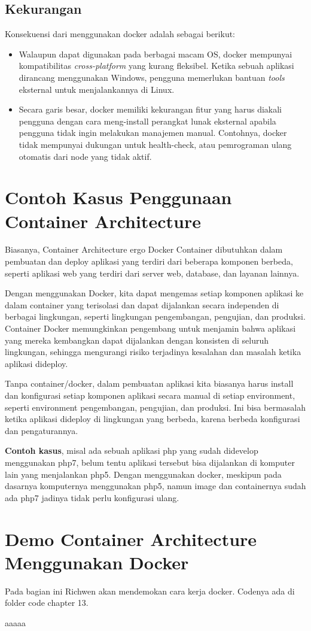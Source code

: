 \subsection{Kekurangan}
Konsekuensi dari menggunakan docker adalah sebagai berikut:
\begin{itemize}
\item Walaupun dapat digunakan pada berbagai macam OS, docker mempunyai kompatibilitas \textit{cross-platform} yang kurang fleksibel. Ketika sebuah aplikasi dirancang menggunakan Windows, pengguna memerlukan bantuan \textit{tools} eksternal untuk menjalankannya di Linux.
\item Secara garis besar, docker memiliki kekurangan fitur yang harus diakali pengguna dengan cara meng-install perangkat lunak eksternal apabila pengguna tidak ingin melakukan manajemen manual. Contohnya, docker tidak mempunyai dukungan untuk health-check, atau pemrograman ulang otomatis dari node yang tidak aktif.
\end{itemize}

\section{Contoh Kasus Penggunaan Container Architecture}

Biasanya, Container Architecture ergo Docker Container dibutuhkan dalam pembuatan dan deploy aplikasi yang terdiri dari beberapa komponen berbeda, seperti {aplikasi web} yang terdiri dari server web, database, dan layanan lainnya.

Dengan menggunakan Docker, kita dapat mengemas setiap komponen aplikasi ke dalam container yang terisolasi dan dapat dijalankan secara independen di berbagai lingkungan, seperti lingkungan pengembangan, pengujian, dan produksi. Container Docker memungkinkan pengembang untuk menjamin bahwa aplikasi yang mereka kembangkan dapat dijalankan dengan konsisten di seluruh lingkungan, sehingga mengurangi risiko terjadinya kesalahan dan masalah ketika aplikasi dideploy.

Tanpa container/docker, dalam pembuatan aplikasi kita biasanya harus install dan konfigurasi setiap komponen aplikasi secara manual di setiap environment, seperti environment pengembangan, pengujian, dan produksi. Ini bisa bermasalah ketika aplikasi dideploy di lingkungan yang berbeda, karena berbeda konfigurasi dan pengaturannya. 

\textbf{Contoh kasus}, misal ada sebuah aplikasi php yang sudah didevelop menggunakan php7, belum tentu aplikasi tersebut bisa dijalankan di komputer lain yang menjalankan php5. Dengan menggunakan docker, meskipun pada dasarnya komputernya menggunakan php5, namun image dan containernya sudah ada php7 jadinya tidak perlu konfigurasi ulang.

\section{Demo Container Architecture Menggunakan Docker}
Pada bagian ini Richwen akan mendemokan cara kerja docker. Codenya ada di folder code chapter 13.

aaaaa
